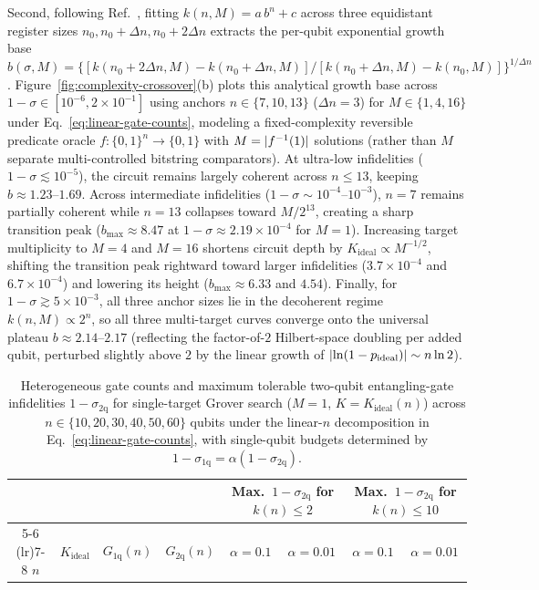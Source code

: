 Second, following Ref.~\cite{SahaRoyLacalle2026}, fitting $k(n, M) = a\,b^n + c$ across three equidistant register sizes $n_0, n_0 + \Delta n, n_0 + 2\Delta n$ extracts the per-qubit exponential growth base $b(\sigma, M) = \{[k(n_0 + 2\Delta n, M) - k(n_0 + \Delta n, M)] / [k(n_0 + \Delta n, M) - k(n_0, M)]\}^{1/\Delta n}$. Figure~\ref{fig:complexity-crossover}(b) plots this analytical growth base across $1 - \sigma \in [10^{-6}, 2 \times 10^{-1}]$ using anchors $n \in \{7, 10, 13\}$ ($\Delta n = 3$) for $M \in \{1, 4, 16\}$ under Eq.~\eqref{eq:linear-gate-counts}, modeling a fixed-complexity reversible predicate oracle $f : \{0, 1\}^n \to \{0, 1\}$ with $M = \lvert f^{-1}(1)\rvert$ solutions (rather than $M$ separate multi-controlled bitstring comparators). At ultra-low infidelities ($1 - \sigma \lesssim 10^{-5}$), the circuit remains largely coherent across $n \le 13$, keeping $b \approx 1.23$--$1.69$. Across intermediate infidelities ($1 - \sigma \sim 10^{-4}$--$10^{-3}$), $n = 7$ remains partially coherent while $n = 13$ collapses toward $M/2^{13}$, creating a sharp transition peak ($b_{\max} \approx 8.47$ at $1 - \sigma \approx 2.19 \times 10^{-4}$ for $M = 1$). Increasing target multiplicity to $M = 4$ and $M = 16$ shortens circuit depth by $K_{\mathrm{ideal}} \propto M^{-1/2}$, shifting the transition peak rightward toward larger infidelities ($3.7 \times 10^{-4}$ and $6.7 \times 10^{-4}$) and lowering its height ($b_{\max} \approx 6.33$ and $4.54$). Finally, for $1 - \sigma \gtrsim 5 \times 10^{-3}$, all three anchor sizes lie in the decoherent regime $k(n, M) \propto 2^n$, so all three multi-target curves converge onto the universal plateau $b \approx 2.14$--$2.17$ (reflecting the factor-of-$2$ Hilbert-space doubling per added qubit, perturbed slightly above $2$ by the linear growth of $\lvert\ln(1 - p_{\mathrm{ideal}})\rvert \sim n\ln 2$).



\begin{table}[t]
\caption{Heterogeneous gate counts and maximum tolerable two-qubit entangling-gate infidelities $1 - \sigma_{2\mathrm{q}}$ for single-target Grover search ($M = 1$, $K = K_{\mathrm{ideal}}(n)$) across $n \in \{10, 20, 30, 40, 50, 60\}$ qubits under the linear-$n$ decomposition in Eq.~\eqref{eq:linear-gate-counts}, with single-qubit budgets determined by $1 - \sigma_{1\mathrm{q}} = \alpha(1 - \sigma_{2\mathrm{q}})$.}
\label{tab:resource-budgets}
\begin{ruledtabular}
\begin{tabular}{cccccccc}
 & & & & \multicolumn{2}{c}{Max.\ $1 - \sigma_{2\mathrm{q}}$ for $k(n) \le 2$} & \multicolumn{2}{c}{Max.\ $1 - \sigma_{2\mathrm{q}}$ for $k(n) \le 10$} \\
\cmidrule(lr){5-6} \cmidrule(lr){7-8}
$n$ & $K_{\mathrm{ideal}}$ & $G_{1\mathrm{q}}(n)$ & $G_{2\mathrm{q}}(n)$ & $\alpha = 0.1$ & $\alpha = 0.01$ & $\alpha = 0.1$ & $\alpha = 0.01$ \\
\midrule

\end{tabular}
\end{ruledtabular}
\end{table}

